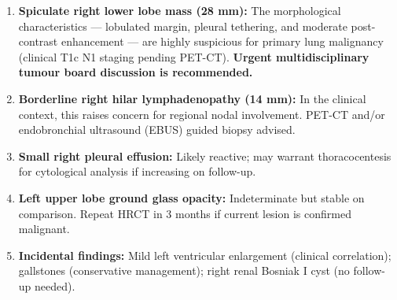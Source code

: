 \documentclass[11pt,a4paper]{article}
\begin{document}
\begin{tcolorbox}[
  enhanced,
  colback=RadHeaderBg,
  colframe=RadTeal,
  arc=5pt,
  boxrule=1.5pt,
  left=10pt, right=10pt, top=8pt, bottom=8pt,
  title={\faExclamationTriangle\hspace{4pt}Radiological Impression},
  fonttitle=\bfseries\color{RadWhite}\normalsize,
  coltitle=RadWhite,
  attach boxed title to top left={yshift=-3mm, xshift=8mm},
  boxed title style={
    colback=RadTeal, colframe=RadTeal, arc=3pt, boxrule=0pt,
    left=5pt, right=5pt, top=2pt, bottom=2pt,
  },
]
\vspace{4pt}
\color{white}
\begin{enumerate}[leftmargin=18pt, label=\textbf{\arabic*.}, itemsep=4pt, parsep=0pt]
  \item \textbf{Spiculate right lower lobe mass (28 mm):} The morphological characteristics --- lobulated margin, pleural tethering, and moderate post-contrast enhancement --- are highly suspicious for primary lung malignancy (clinical T1c N1 staging pending PET-CT). \textbf{Urgent multidisciplinary tumour board discussion is recommended.}
  \item \textbf{Borderline right hilar lymphadenopathy (14 mm):} In the clinical context, this raises concern for regional nodal involvement. PET-CT and/or endobronchial ultrasound (EBUS) guided biopsy advised.
  \item \textbf{Small right pleural effusion:} Likely reactive; may warrant thoracocentesis for cytological analysis if increasing on follow-up.
  \item \textbf{Left upper lobe ground glass opacity:} Indeterminate but stable on comparison. Repeat HRCT in 3 months if current lesion is confirmed malignant.
  \item \textbf{Incidental findings:} Mild left ventricular enlargement (clinical correlation); gallstones (conservative management); right renal Bosniak I cyst (no follow-up needed).
\end{enumerate}
\vspace{4pt}
\end{tcolorbox}

\vspace{8pt}

\end{document}
